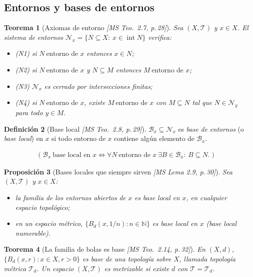 \documentclass[11pt,a4paper]{article}
\newenvironment{lista}{\leavevmode\begin{itemize}[leftmargin=1.5em,itemsep=1pt,topsep=2pt,parsep=0pt]}{\end{itemize}}
\newcommand{\lgc}[1]{\par\vspace{-3pt}\begin{gather*}\big(\;#1\;\big)\end{gather*}\vspace{-6pt}}
\theoremstyle{definition}
\newtheorem{definicion}{Definición}[section]
\theoremstyle{plain}
\newtheorem{teorema}[definicion]{Teorema}
\newtheorem{proposicion}[definicion]{Proposición}
\newcommand{\fnt}[1]{{\normalfont\small\itshape\color{gray!150!black}[#1]}}
\newcommand{\N}{\mathbb{N}}
\newcommand{\intr}{\operatorname{int}}
\newcommand{\Bola}[2]{B_d(#1,#2)}
\newcommand{\tp}{\mathcal{T}}
\begin{document}
\subsection{Entornos y bases de entornos}

\begin{teorema}[Axiomas de entorno \fnt{MS Teo.\ 2.7, p.\,28}]
Sea $(X,\tp)$ y $x\in X$. El sistema de entornos $\mathcal N_x=\{N\subseteq X:\ x\in\intr N\}$ verifica:
\begin{lista}
\item (N1) si $N\ \text{entorno de } x$ entonces $x\in N$;
\item (N2) si $N\ \text{entorno de } x$ y $N\subseteq M$ entonces $M\ \text{entorno de } x$;
\item (N3) $\mathcal N_x$ es cerrado por intersecciones finitas;
\item (N4) si $N\ \text{entorno de } x$, existe $M\ \text{entorno de } x$ con $M\subseteq N$ tal que $N\in\mathcal N_y$ para todo $y\in M$.
\end{lista}
\end{teorema}

\begin{definicion}[Base local \fnt{MS Teo.\ 2.8, p.\,29}]
$\mathcal B_x\subseteq\mathcal N_x$ es \emph{base de entornos} (o \emph{base local}) en $x$ si todo entorno de $x$ contiene algún elemento de $\mathcal B_x$.
\lgc{\mathcal B_x\ \text{base local en } x\iff \forall N\ \text{entorno de } x\ \exists B\in\mathcal B_x:\ B\subseteq N.}
\end{definicion}

\begin{proposicion}[Bases locales que siempre sirven \fnt{MS Lema 2.9, p.\,30}]
Sea $(X,\tp)$ y $x\in X$:
\begin{lista}
\item la familia de los entornos \emph{abiertos} de $x$ es base local en $x$, en cualquier espacio topológico;
\item en un espacio métrico, $\{\Bola{x}{1/n}: n\in\N\}$ es base local en $x$ (base local \emph{numerable}).
\end{lista}
\end{proposicion}


\begin{teorema}[La familia de bolas es base \fnt{MS Teo.\ 2.14, p.\,32}]
En $(X,d)$, $\{\Bola{x}{r}: x\in X, r>0\}$ es base de una topología sobre $X$, llamada \emph{topología métrica} $\tp_d$. Un espacio $(X,\tp)$ es \emph{metrizable} si existe $d$ con $\tp=\tp_d$.
\end{teorema}
\end{document}

